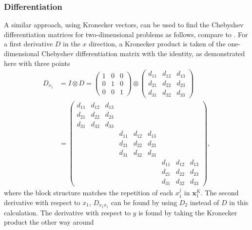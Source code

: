 \documentclass[11pt, a4paper]{article}
\theoremstyle{definition}
\begin{document}
\subsubsection{Differentiation}
A similar approach, using Kronecker vectors, can be used to find the Chebyshev differentiation matrices for two-dimensional problems as follows, compare to \cite{bibTrefethen}. For a first derivative $D$ in the $x$ direction, a Kronecker product is taken of the one-dimensional Chebyshev differentiation matrix with the identity, as demonstrated here with three points
\begin{align*}
	D_{x_1}&=I \otimes D = 
	\begin{pmatrix}
		1 & 0 & 0\\
		0 & 1 & 0 \\
		0 & 0 & 1
	\end{pmatrix}
	\otimes
	\begin{pmatrix}
		d_{11} & d_{12} & d_{13}\\
		d_{21} & d_{22} & d_{23} \\
		d_{31} & d_{32} & d_{33}
	\end{pmatrix}
	\\&=
	\begin{pmatrix}
		d_{11} & d_{12} & d_{13} & & &  & & &\\
		d_{21} & d_{22} & d_{23} & & & & & & \\
		d_{31} & d_{32} & d_{33} & & & & & & \\
		& & &d_{11} & d_{12} & d_{13} & & &\\
		& & &d_{21} & d_{22} & d_{23}  & & &\\
		& & &d_{31} & d_{32} & d_{33} & & &\\
		& & & & & &d_{11} & d_{12} & d_{13}\\
		& & & & & &d_{21} & d_{22} & d_{23}  \\
		& & & & & &d_{31} & d_{32} & d_{33} 
	\end{pmatrix},
\end{align*}
where the block structure matches the repetition of each $x_1^j$ in $\mathbf{x}_1^{K}$.
The second derivative with respect to ${x_1}$, $D_{x_1x_1}$ can be found by using $D_2$ instead of $D$ in this calculation. 
The derivative with respect to $y$ is found by taking the Kronecker product the other way around
\end{document}
